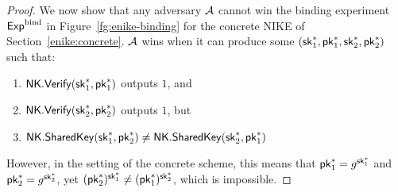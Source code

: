 \begin{proof}
  We now show that any adversary $\mathcal{A}$ cannot win the binding experiment $\textsf{Exp}^{\textrm{bind}}$ in Figure~\ref{fg:enike-binding} for the concrete NIKE of Section~\ref{enike:concrete}.
  $\mathcal{A}$ wins when it can produce some $(\mathsf{sk}_1^*, \mathsf{pk}_1^*, \mathsf{sk}_2^*, \mathsf{pk}_2^*)$ such that:

  \begin{enumerate}
    \item $\mathsf{NK}.\mathsf{Verify}(\mathsf{sk}_1^*, \mathsf{pk}_1^*)$ outputs $1$, and
    \item $\mathsf{NK}.\mathsf{Verify}(\mathsf{sk}_2^*, \mathsf{pk}_2^*)$ outputs $1$, but
    \item $\mathsf{NK}.\mathsf{SharedKey}(\mathsf{sk}_1^*, \mathsf{pk}_2^*) \neq \mathsf{NK}.\mathsf{SharedKey}(\mathsf{sk}_2^*, \mathsf{pk}_1^*) $
  \end{enumerate}

  However, in the setting of the concrete scheme, this means that
  $\mathsf{pk}_1^* = g^{\mathsf{sk}_1^*}$ and $\mathsf{pk}_2^* = g^{\mathsf{sk}_2^*}$, yet
  $({\mathsf{pk}_2^*})^{\mathsf{sk}_1^*} \neq ({\mathsf{pk}_1^*})^{\mathsf{sk}_2^*}$, which is impossible.
\end{proof}

